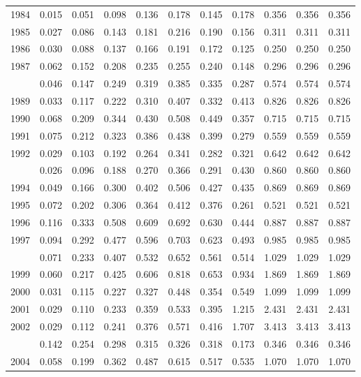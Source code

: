 \documentclass[
]{article}
\begin{document}
\begin{longtable}[t]{lrrrrrrrrrr}
1984 & 0.015 & 0.051 & 0.098 & 0.136 & 0.178 & 0.145 & 0.178 & 0.356 & 0.356 & 0.356\\
1985 & 0.027 & 0.086 & 0.143 & 0.181 & 0.216 & 0.190 & 0.156 & 0.311 & 0.311 & 0.311\\
1986 & 0.030 & 0.088 & 0.137 & 0.166 & 0.191 & 0.172 & 0.125 & 0.250 & 0.250 & 0.250\\
1987 & 0.062 & 0.152 & 0.208 & 0.235 & 0.255 & 0.240 & 0.148 & 0.296 & 0.296 & 0.296\\
\addlinespace
1988 & 0.046 & 0.147 & 0.249 & 0.319 & 0.385 & 0.335 & 0.287 & 0.574 & 0.574 & 0.574\\
1989 & 0.033 & 0.117 & 0.222 & 0.310 & 0.407 & 0.332 & 0.413 & 0.826 & 0.826 & 0.826\\
1990 & 0.068 & 0.209 & 0.344 & 0.430 & 0.508 & 0.449 & 0.357 & 0.715 & 0.715 & 0.715\\
1991 & 0.075 & 0.212 & 0.323 & 0.386 & 0.438 & 0.399 & 0.279 & 0.559 & 0.559 & 0.559\\
1992 & 0.029 & 0.103 & 0.192 & 0.264 & 0.341 & 0.282 & 0.321 & 0.642 & 0.642 & 0.642\\
\addlinespace
1993 & 0.026 & 0.096 & 0.188 & 0.270 & 0.366 & 0.291 & 0.430 & 0.860 & 0.860 & 0.860\\
1994 & 0.049 & 0.166 & 0.300 & 0.402 & 0.506 & 0.427 & 0.435 & 0.869 & 0.869 & 0.869\\
1995 & 0.072 & 0.202 & 0.306 & 0.364 & 0.412 & 0.376 & 0.261 & 0.521 & 0.521 & 0.521\\
1996 & 0.116 & 0.333 & 0.508 & 0.609 & 0.692 & 0.630 & 0.444 & 0.887 & 0.887 & 0.887\\
1997 & 0.094 & 0.292 & 0.477 & 0.596 & 0.703 & 0.623 & 0.493 & 0.985 & 0.985 & 0.985\\
\addlinespace
1998 & 0.071 & 0.233 & 0.407 & 0.532 & 0.652 & 0.561 & 0.514 & 1.029 & 1.029 & 1.029\\
1999 & 0.060 & 0.217 & 0.425 & 0.606 & 0.818 & 0.653 & 0.934 & 1.869 & 1.869 & 1.869\\
2000 & 0.031 & 0.115 & 0.227 & 0.327 & 0.448 & 0.354 & 0.549 & 1.099 & 1.099 & 1.099\\
2001 & 0.029 & 0.110 & 0.233 & 0.359 & 0.533 & 0.395 & 1.215 & 2.431 & 2.431 & 2.431\\
2002 & 0.029 & 0.112 & 0.241 & 0.376 & 0.571 & 0.416 & 1.707 & 3.413 & 3.413 & 3.413\\
\addlinespace
2003 & 0.142 & 0.254 & 0.298 & 0.315 & 0.326 & 0.318 & 0.173 & 0.346 & 0.346 & 0.346\\
2004 & 0.058 & 0.199 & 0.362 & 0.487 & 0.615 & 0.517 & 0.535 & 1.070 & 1.070 & 1.070\\

\end{longtable}
\end{document}
